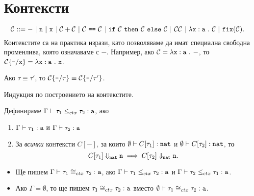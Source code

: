 \section{Контексти}
\[\C ::= -\ |\ \vv{n}\ |\ \vv{x}\ |\ \C + \C\ |\ \C\ \vv{==}\ \C\ |\ \ifelse{\C}{\C}{\C}\ |\ \C\C\ |\ \lamb{x}{a}{\C}\ |\ \fix(\C).\]
Контекстите са на практика изрази, като позволяваме да имат специална свободна променлива, която означаваме с $-$.
Например, ако $\mathcal{C} = \lambda\texttt{x}:\texttt{a}\ .\ {-}$, то $\mathcal{C}\{\texttt{-}/{\texttt{x}}\} = \lambda\texttt{x}:\texttt{a}\ .\ {\texttt{x}}$.

\begin{proposition}
  Ако $\tau \equiv \tau'$, то $\mathcal{C}\{\texttt{-}/{\tau}\} \equiv \mathcal{C}\{\texttt{-}/{\tau'}\}$.
\end{proposition}
\begin{hint}
  Индукция по построението на контекстите.
\end{hint}

\begin{definition}
  Дефинираме $\Gamma \vdash \tau_1 \leq_{ctx} \tau_2 : \texttt{a}$, ако
  \begin{enumerate}[1)]
  \item
    $\Gamma \vdash \tau_1 : \texttt{a}$ и $\Gamma \vdash \tau_2 : \texttt{a}$
  \item
    За \emph{всички} контексти $C[-]$, за които $\emptyset \vdash C[\tau_1] : \texttt{nat}$ и $\emptyset \vdash C[\tau_2] : \texttt{nat}$, то
    \[C[\tau_1] \Downarrow_{\texttt{nat}} \texttt{n} \implies C[\tau_2] \Downarrow_{\texttt{nat}} \texttt{n}.\]
  \end{enumerate}  
\end{definition}

\begin{itemize}
\item 
  Ще пишем $\Gamma \vdash \tau_1 \cong_{ctx} \tau_2 : \texttt{a}$, ако
  $\Gamma \vdash \tau_1 \leq_{ctx} \tau_2 : \texttt{a}$ и $\Gamma \vdash \tau_2 \leq_{ctx} \tau_1 : \texttt{a}$.
\item
  Ако $\Gamma = \emptyset$, то ще пишем $\tau_1 \cong_{ctx} \tau_2 : \texttt{a}$ вместо $\emptyset \vdash \tau_1 \cong_{ctx} \tau_2 : \texttt{a}$.  
\end{itemize}

